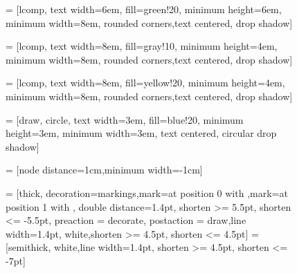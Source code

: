 \documentclass[final]{beamer}
\begin{document}
\begin{frame}[t]
\begin{columns}
\begin{column}{0.5\linewidth}
\begin{figure}[!h]
 = [lcomp, text width=6em,
    fill=green!20, minimum height=6em, minimum width=8em, rounded corners,text centered, drop shadow]

 = [lcomp, text width=8em, fill=gray!10, 
    minimum height=4em, minimum width=8em, rounded corners,text centered, drop shadow]

 = [lcomp, text width=8em, fill=yellow!20, 
    minimum height=4em, minimum width=8em, rounded corners,text centered, drop shadow]

 = [draw, circle, text width=3em, fill=blue!20,
	minimum height=3em, minimum width=3em, text centered, circular drop shadow]

 = [node distance=1cm,minimum width=-1cm]

 = [thick, decoration={markings,mark=at position 0 with {},mark=at position
   1 with {}},
   double distance=1.4pt, shorten >= 5.5pt, shorten <= -5.5pt,
   preaction = {decorate},
   postaction = {draw,line width=1.4pt, white,shorten >= 4.5pt, shorten <= 4.5pt}]
 = [semithick, white,line width=1.4pt, shorten >= 4.5pt, shorten <= -7pt]

\centering
{}
\end{figure}
\end{column}
\end{columns}
\end{frame}
\end{document}
